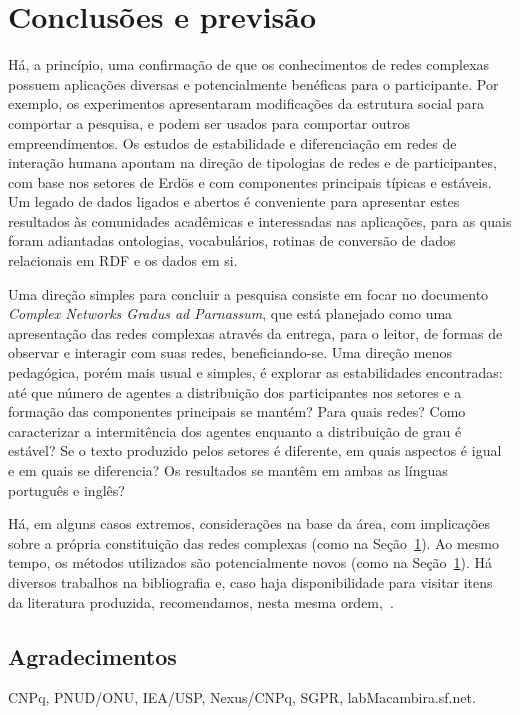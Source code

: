 \documentclass[a4paper,openright,12pt]{report} %
\begin{document}
\chapter{Conclusões e previsão}
Há, a princípio, uma confirmação de que os conhecimentos de redes complexas
possuem aplicações diversas e potencialmente benéficas para o participante.
Por exemplo, os experimentos apresentaram modificações da estrutura social para comportar a pesquisa, e podem ser usados para comportar outros empreendimentos. Os estudos de estabilidade e diferenciação em redes de interação humana apontam na direção de tipologias de redes e de participantes, com base nos setores de Erdös e com componentes principais típicas e estáveis.
Um legado de dados ligados e abertos é conveniente para apresentar estes resultados às comunidades acadêmicas e interessadas nas aplicações, para as quais foram adiantadas ontologias, vocabulários, rotinas de conversão de dados relacionais em RDF e os dados em si.

Uma direção simples para concluir a pesquisa
consiste em focar no documento \emph{Complex Networks Gradus ad Parnassum},
que está planejado como uma apresentação das redes complexas através
da entrega, para o leitor, de formas de observar e interagir com suas redes, beneficiando-se.
Uma direção menos pedagógica, porém mais usual e simples, é
explorar as estabilidades encontradas: até que número de
agentes a distribuição dos participantes nos setores e a
formação das componentes principais se mantém? Para quais redes?
Como caracterizar a intermitência dos agentes enquanto a distribuição de
grau é estável? Se o texto produzido pelos setores é diferente,
em quais aspectos é igual e em quais se diferencia?
Os resultados se mantêm em ambas as línguas português e inglês?

Há, em alguns casos extremos, considerações na base da área,
com implicações sobre a própria constituição das redes complexas
(como na Seção~\ref{}).
Ao mesmo tempo, os métodos utilizados são potencialmente novos (como na Seção~\ref{}).
Há diversos trabalhos na bibliografia e,
caso haja disponibilidade para visitar itens da literatura
produzida, recomendamos, nesta mesma ordem,~\cite{timeS,pnud5,ensaioAA,gmane,fourHubs}.

\section*{Agradecimentos}
CNPq, PNUD/ONU, IEA/USP, Nexus/CNPq, SGPR, labMacambira.sf.net.


\end{document}
